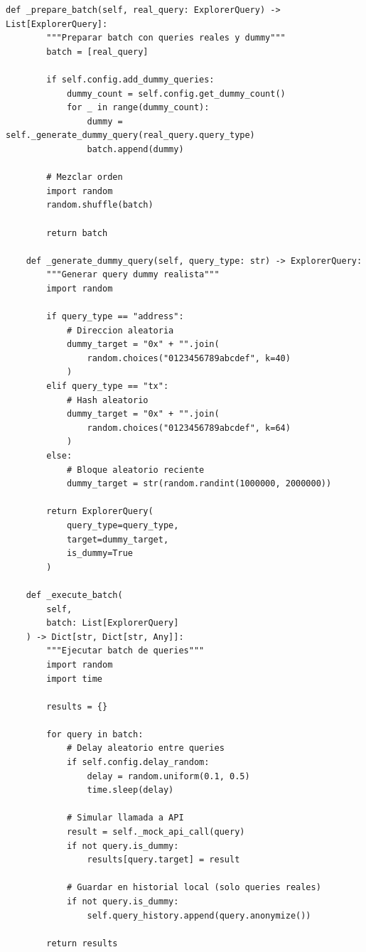 \documentclass[11pt,a4paper,twoside]{book}
\theoremstyle{definition}
\theoremstyle{remark}
\begin{document}
\begin{lstlisting}[style=python, caption={Explorador de blockchain privacy-aware}]
    def _prepare_batch(self, real_query: ExplorerQuery) -> List[ExplorerQuery]:
        """Preparar batch con queries reales y dummy"""
        batch = [real_query]
        
        if self.config.add_dummy_queries:
            dummy_count = self.config.get_dummy_count()
            for _ in range(dummy_count):
                dummy = self._generate_dummy_query(real_query.query_type)
                batch.append(dummy)
        
        # Mezclar orden
        import random
        random.shuffle(batch)
        
        return batch
    
    def _generate_dummy_query(self, query_type: str) -> ExplorerQuery:
        """Generar query dummy realista"""
        import random
        
        if query_type == "address":
            # Direccion aleatoria
            dummy_target = "0x" + "".join(
                random.choices("0123456789abcdef", k=40)
            )
        elif query_type == "tx":
            # Hash aleatorio
            dummy_target = "0x" + "".join(
                random.choices("0123456789abcdef", k=64)
            )
        else:
            # Bloque aleatorio reciente
            dummy_target = str(random.randint(1000000, 2000000))
        
        return ExplorerQuery(
            query_type=query_type,
            target=dummy_target,
            is_dummy=True
        )
    
    def _execute_batch(
        self, 
        batch: List[ExplorerQuery]
    ) -> Dict[str, Dict[str, Any]]:
        """Ejecutar batch de queries"""
        import random
        import time
        
        results = {}
        
        for query in batch:
            # Delay aleatorio entre queries
            if self.config.delay_random:
                delay = random.uniform(0.1, 0.5)
                time.sleep(delay)
            
            # Simular llamada a API
            result = self._mock_api_call(query)
            if not query.is_dummy:
                results[query.target] = result
            
            # Guardar en historial local (solo queries reales)
            if not query.is_dummy:
                self.query_history.append(query.anonymize())
        
        return results
    

\end{lstlisting}
\end{document}
